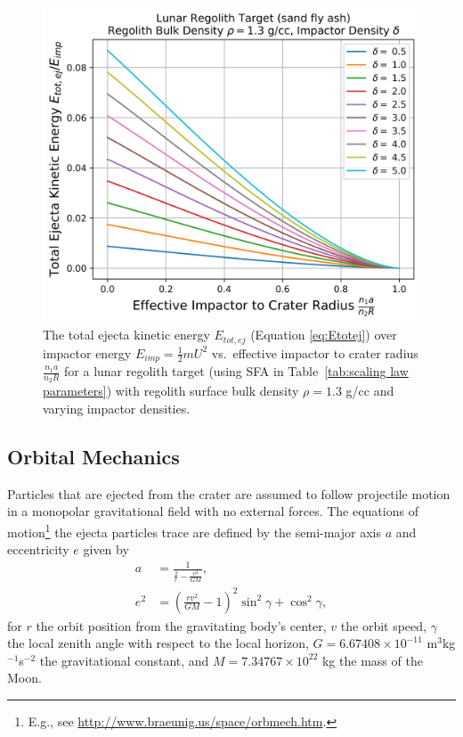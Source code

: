 \documentclass{article}
\begin{document}
\begin{figure}[!htb]
	\centering
	\includegraphics[width=0.8\linewidth]{TotalEjectaKE_vs_EffectiveCraterSize.png}
	\caption{The total ejecta kinetic energy $E_{tot,ej}$ (Equation \eqref{eq:Etotej}) over impactor energy $E_{imp} = \frac{1}{2}mU^2$ vs.\ effective impactor to crater radius $\frac{n_1 a}{n_2 R}$ for a lunar regolith target (using SFA in Table~\ref{tab:scaling law parameters}) with regolith surface bulk density $\rho = 1.3$ g/cc and varying impactor densities. }\label{fig:TotalEjectaKE_vs_EffectiveCraterSize}
\end{figure}

\clearpage

\subsection{Orbital Mechanics}\label{ssec:Orbital Mechanics}

Particles that are ejected from the crater are assumed to follow projectile motion in a monopolar gravitational field with no external forces. The equations of motion\footnote{E.g., see \href{http://www.braeunig.us/space/orbmech.htm}{http://www.braeunig.us/space/orbmech.htm}.} the ejecta particles trace are defined by the semi-major axis $a$ and eccentricity $e$ given by
\begin{align}
a &= \frac{1}{\frac{2}{r} - \frac{v^2}{GM}},\label{eq:a_GM}\\
e^2 &= \left(\frac{rv^2}{GM} - 1\right)^2\sin^2\gamma + \cos^2\gamma,\label{eq:e_GM}
\end{align}
for $r$ the orbit position from the gravitating body's center, $v$ the orbit speed, $\gamma$ the local zenith angle with respect to the local horizon, $G = 6.67408\times 10^{-11}$ m$^3$kg$^{-1}$s$^{-2}$ the gravitational constant, and $M = 7.34767\times 10^{22}$ kg the mass of the Moon.
\end{document}

